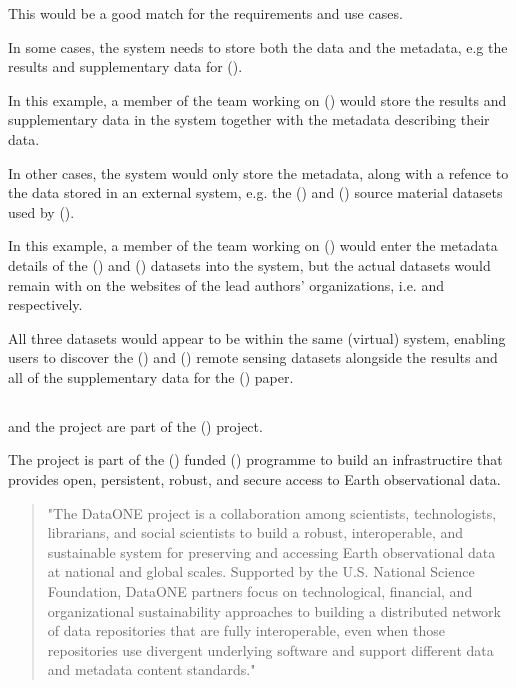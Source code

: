 \documentclass{article}
\begin{document}
This would be a good match for the \cite{tropo} requirements and use cases.

In some cases, the \cite{atrop} system needs to store both the data and the
metadata, e.g the results and supplementary data for (\cite{mitchard-2014}).

In this example, a member of the team working on (\cite{mitchard-2014})
would store the results and supplementary data in the \cite{atrop} system
together with the metadata describing their data.

In other cases, the \cite{atrop} system would only store the metadata,
along with a refence to the data stored in an external system, e.g. the
(\cite{saatchi-2011}) and (\cite{baccini-2012}) source material datasets
used by (\cite{mitchard-2014}).

In this example, a member of the team working on (\cite{mitchard-2014})
would enter the metadata details of the (\cite{saatchi-2011}) and
(\cite{baccini-2012}) datasets into the \cite{atrop} system, but the actual
datasets would remain with on the websites of the lead authors' organizations,
i.e.  and  respectively.

All three datasets would appear to be within the same (virtual)
system, enabling \cite{tropo} users to discover the (\cite{saatchi-2011})
and (\cite{baccini-2012}) remote sensing datasets alongside the results
and all of the supplementary data for the (\cite{mitchard-2014}) paper.

\subsection{}

\cite{metacat} and the \cite{knb} project are part of the
 (\cite{data-one}) project.

The \cite{data-one} project is part of the  (\cite{nsf})
funded  (\cite{data-net}) programme to build an
infrastructire that provides open, persistent, robust, and secure access
to Earth observational data.
 
\begin{quote}
"The DataONE project is a collaboration among scientists, technologists,
librarians, and social scientists to build a robust, interoperable,
and sustainable system for preserving and accessing Earth observational
data at national and global scales. Supported by the U.S. National
Science Foundation, DataONE partners focus on technological, financial,
and organizational sustainability approaches to building a distributed
network of data repositories that are fully interoperable, even when those
repositories use divergent underlying software and support different data
and metadata content standards."
\end{quote}
\end{document}
